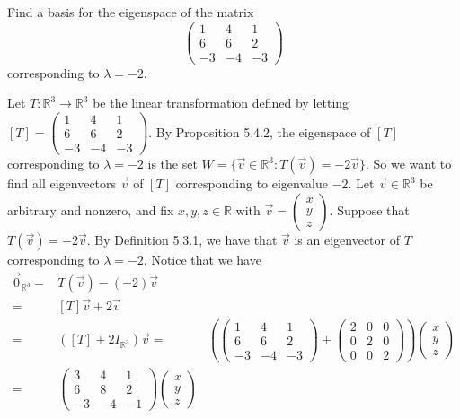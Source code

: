 \documentclass[12pt]{article}
\newenvironment{problem}[2][Problem]
{
	\begin{trivlist} 
		\item[\hskip \labelsep {\bfseries #1 #2:}]
	}
{
	\end{trivlist}
	}
\newenvironment{solution}[1][Solution]
{
	\begin{trivlist} 
		\item[\hskip \labelsep {\itshape #1:}]
	}
	{
	\end{trivlist}
}
\begin{document}
\newpage
\begin{problem}{5}
Find a basis for the eigenspace of the matrix
\[
\begin{pmatrix}1&4&1\\6&6&2\\-3&-4&-3 \end{pmatrix}
\]
corresponding to $\lambda = -2$.
\noindent
\newline
\newline
\begin{solution}
Let $T:\mathbb{R}^3 \to \mathbb{R}^3$ be the linear transformation defined by letting $[T]=\begin{pmatrix}1&4&1\\6&6&2\\-3&-4&-3 \end{pmatrix}$. By Proposition 5.4.2, the eigenspace of $[T]$ corresponding to $\lambda=-2$ is the set $W=\{\vec{v} \in \mathbb{R}^3: T(\vec{v})= -2 \vec{v}\}$. So we want to find all eigenvectors $\vec{v}$ of $[T]$ corresponding to eigenvalue $-2$. Let $\vec{v} \in \mathbb{R}^3$ be arbitrary and nonzero, and fix $x,y,z \in \mathbb{R}$ with $\vec{v} = \begin{pmatrix} x\\y\\z \end{pmatrix}$. Suppose that $T(\vec{v})  =-2\vec{v}$. By Definition 5.3.1, we have that $\vec{v}$ is an eigenvector of $T$ corresponding to $\lambda =-2$. Notice that we have
\begin{align*}
\vec{0}_{\mathbb{R}^3} =& T(\vec{v}) - (-2)\vec{v}\\
=& [T]\vec{v} + 2 \vec{v}\\
=& ([T] +2 I_{\mathbb{R}^3}) \vec{v}
=&\left(\begin{pmatrix}1&4&1\\6&6&2\\-3&-4&-3 \end{pmatrix} + \begin{pmatrix}2&0&0\\0&2&0\\0&0&2 \end{pmatrix}\right) \begin{pmatrix} x\\y\\z \end{pmatrix}\\
=&\begin{pmatrix}3&4&1\\6&8&2\\-3&-4&-1 \end{pmatrix} \begin{pmatrix} x\\y\\z \end{pmatrix}\\

\end{align*}
\end{solution}
\end{problem}
\end{document}
